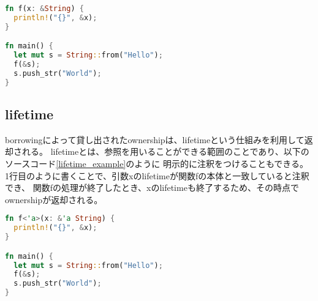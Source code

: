 \documentclass{sumiilab-paper}
\theoremstyle{mystyle}
\numberwithin{definition}{chapter} %
\begin{document}
\begin{lstlisting}[language=Rust, caption=borrowingの例, label=borrowing_example, captionpos=b]
fn f(x: &String) {
  println!("{}", &x);
}

fn main() {
  let mut s = String::from("Hello");
  f(&s);
  s.push_str("World");
}
\end{lstlisting}

\subsection{lifetime}
borrowingによって貸し出されたownershipは、lifetimeという仕組みを利用して返却される。
lifetimeとは、参照を用いることができる範囲のことであり、以下のソースコード\ref{lifetime_example}のように
明示的に注釈をつけることもできる。
1行目のように書くことで、引数xのlifetimeが関数fの本体と一致していると注釈でき、
関数fの処理が終了したとき、xのlifetimeも終了するため、その時点でownershipが返却される。
\begin{lstlisting}[language=Rust, caption=lifetime注釈, label=lifetime_example, captionpos=b]
fn f<'a>(x: &'a String) {
  println!("{}", &x);
}

fn main() {
  let mut s = String::from("Hello");
  f(&s);
  s.push_str("World");
}
\end{lstlisting}
\end{document}
